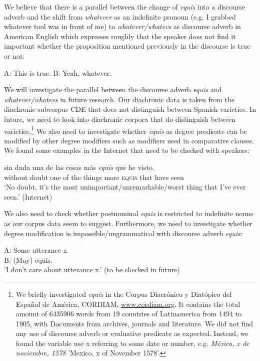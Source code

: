 \documentclass[output=paper
,modfonts
,nonflat]{langsci/langscibook}
\begin{document}
We believe that there is a parallel between the change of \textit{equis} into a discourse adverb and the shift from \textit{whatever} as an indefinite pronoun (e.g. I grabbed whatever tool was in front of me) to \textit{whatever/whatevs} as discourse adverb in American English which expresses roughly that the speaker does not find it important whether the proposition mentioned previously in the discourse is true or not:

\ea
A: This is true. B: Yeah, whatever.
\z

We will investigate the parallel between the discourse adverb \textit{equis} and \textit{whatever/whatevs} in future research. Our diachronic data is taken from the diachronic subcorpus CDE that does not distinguish between Spanish varieties. In future, we need to look into diachronic corpora that do distinguish between varieties.\footnote{We briefly investigated \textit{equis} in the Corpus Diacrónico y Diatópico del Español de América, CORDIAM, \href{http://www.cordiam.org}{www.cordiam.org}. It contains the total amount of 6435906 words from 19 countries of Latinamerica from 1494 to 1905, with Documents from archives, journals and literature. We did not find any use of discourse adverb or evaluative predicate as expected. Instead, we found the variable use x referring to some date or number, e.g. \textit{México, x de noviembre, 1578} 'Mexico, x of November 1578'.}
We also need to investigate whether \textit{equis} as degree predicate can be modified by other degree modifiers such as modifiers used in comparative clauses. We found some examples in the Internet that need to be checked with speakers:

\ea
\gll sin duda una de las cosas más \textit{equis} que he visto.\\
without doubt one of the things more \textsc{equis} that have seen\\
\glt ‘No doubt, it’s the most unimportant/unremarkable/worst thing that I’ve ever seen.’ (Internet)
\z

We also need to check whether postnominal \textit{equis} is restricted to indefinite nouns as our corpus data seem to suggest. Furthermore, we need to investigate whether degree modification is impossible/ungrammatical with discourse adverb \textit{equis}:

\ea
\gll A: Some utterance x \\
B: (Muy) equis.\\
\glt ‘I don’t care about utterance x.’ (to be checked in future)
\z
\end{document}
